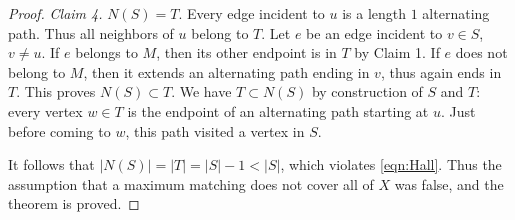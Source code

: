 \begin{proof}
\emph{Claim 4.} $N(S) = T$.
Every edge incident to $u$ is a length $1$ alternating path.
Thus all neighbors of $u$ belong to $T$.
Let $e$ be an edge incident to $v \in S$, $v \ne u$.
If $e$ belongs to $M$, then its other endpoint is in $T$ by Claim 1.
If $e$ does not belong to $M$, then it extends an alternating path ending in $v$, thus again ends in $T$.
This proves $N(S) \subset T$.
We have $T \subset N(S)$ by construction of $S$ and $T$: every vertex $w \in T$ is the endpoint of an alternating path starting at $u$.
Just before coming to $w$, this path visited a vertex in $S$.

It follows that $|N(S)| = |T| = |S| - 1 < |S|$, which violates \eqref{eqn:Hall}.
Thus the assumption that a maximum matching does not cover all of $X$ was false, and the theorem is proved.
\end{proof}

